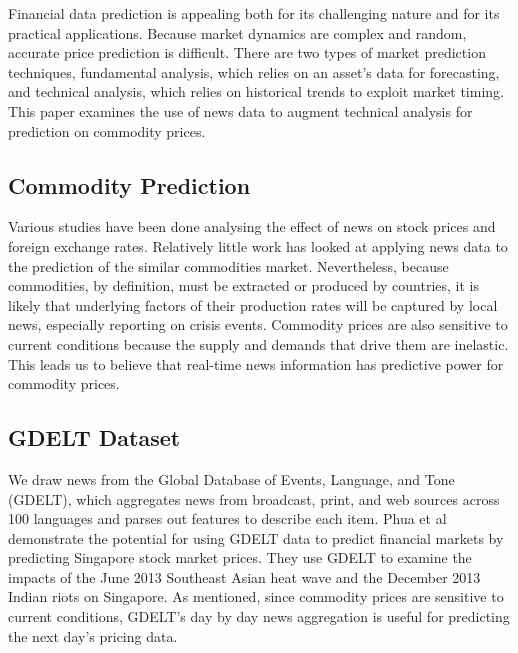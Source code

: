 Financial data prediction is appealing both for its challenging nature and for its practical applications. Because market dynamics are complex and random, accurate price prediction is difficult. There are two types of market prediction techniques, fundamental analysis, which relies on an asset's data for forecasting, and technical analysis, which relies on historical trends to exploit market timing.\cite{schumaker2009textual} This paper examines the use of news data to augment technical analysis for prediction on commodity prices.

\subsection{Commodity Prediction}
Various studies have been done analysing the effect of news on stock prices\cite{mcqueen1993stock} and foreign exchange rates\cite{kamruzzaman2003svm}. Relatively little work has looked at applying news data to the prediction of the similar commodities market. Nevertheless, because commodities, by definition, must be extracted or produced by countries, it is likely that underlying factors of their production rates will be captured by local news, especially reporting on crisis events. Commodity prices are also sensitive to current conditions because the supply and demands that drive them are inelastic.\cite{chen2008can} This leads us to believe that real-time news information has predictive power for commodity prices. 

\subsection{GDELT Dataset}
We draw news from the Global Database of Events, Language, and Tone (GDELT), which aggregates news from broadcast, print, and web sources across 100 languages and parses out features to describe each item. Phua et al demonstrate the potential for using GDELT data to predict financial markets by predicting Singapore stock market prices. They use GDELT  to examine the impacts of the June 2013 Southeast Asian heat wave and the December 2013 Indian riots on Singapore.\cite{phua2014visual} As mentioned, since commodity prices are sensitive to current conditions, GDELT's day by day news aggregation is useful for predicting the next day's pricing data.
